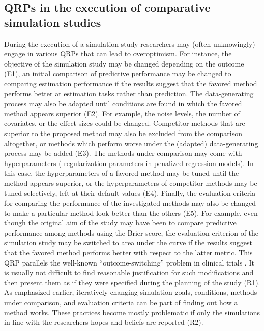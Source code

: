 \documentclass[a4paper, 11pt]{article}
\begin{document}
\subsection{QRPs in the execution of comparative simulation studies}
During the execution of a simulation study researchers may (often unknowingly) 
engage in various QRPs that can lead to overoptimism. For instance, the objective
of the simulation study may be changed depending on the outcome (E1), \eg{} an
initial comparison of predictive performance may be changed to comparing 
estimation performance if the results suggest that the favored method performs 
better at estimation tasks rather than prediction.
The data-generating process
may also be adapted until conditions are found in which the favored method appears superior (E2).
For example, the noise levels, the number of covariates, or the effect sizes could be changed.
Competitor methods that are superior to the proposed method may also be
excluded from the comparison altogether, or methods which
perform worse under the (adapted) data-generating process may be added (E3).
The methods under comparison may come with hyperparameters (\eg{}
regularization parameters in penalized regression models). In this case, 
the hyperparameters of a favored method may be tuned until the method appears
superior, or the hyperparameters of competitor methods
may be tuned selectively, \eg{} left at their default values (E4).
Finally, the evaluation criteria for comparing the performance of the investigated
methods may also be changed to make a particular method look better than the others (E5). 
For example, even though the original aim of the study may have been to compare
predictive performance among methods using the Brier score, the evaluation criterion
of the simulation study may be switched to area under the curve if the results 
suggest that the favored method performs better with respect to the latter metric.
This QRP parallels the well-known ``outcome-switching'' problem in clinical trials
\citep{Altman2017}. It is usually not difficult to find reasonable justification for
such modifications and then present them as if they were specified during the planning 
of the study (R1). As emphasized earlier, iteratively changing simulation goals, 
conditions, methods under comparison, and evaluation criteria can be part of finding
out how a method works. These practices
become mostly problematic if only the simulations in line with the
researchers hopes and beliefs are reported (R2).
\end{document}
